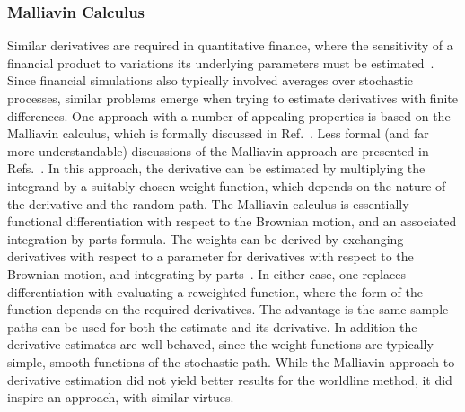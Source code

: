\subsubsection{Malliavin Calculus}
Similar derivatives are required in quantitative finance, where the sensitivity of a financial 
product to variations its underlying parameters must be estimated~\cite{Glasserman2004}.  
Since financial simulations also typically involved averages over stochastic processes, similar problems emerge
when trying to estimate derivatives with finite differences.
One approach with a number of appealing properties is based on the Malliavin calculus, which 
is formally discussed in Ref.~\cite{Nualart2006, Malliavin2006, DiNunno2009}.
Less formal (and far more understandable) discussions of the Malliavin approach are presented in Refs.~\cite{Chen2007,Kohatsu-Higa2003,Kohatsu-Higa2004}.
In this approach, the derivative can be estimated by multiplying the integrand by
a suitably chosen weight function, which depends on the nature of the derivative and the random path.
The Malliavin calculus is essentially functional differentiation with respect to the Brownian motion, 
and an associated integration by parts formula.   
The weights can be derived by exchanging derivatives with respect to a parameter for
derivatives with respect to the Brownian motion, and integrating by parts~\cite{Kohatsu-Higa2004}.  
In either case, one replaces differentiation with
evaluating a reweighted function, where the form of the function depends on the required derivatives.
The advantage is the same sample paths can be used for both the estimate and its derivative.  In addition
the derivative estimates are well behaved, since the weight functions are typically simple, smooth functions
of the stochastic path.   
While the Malliavin approach to derivative estimation did not yield better results for the worldline
method, it did inspire an approach, with similar virtues.   

